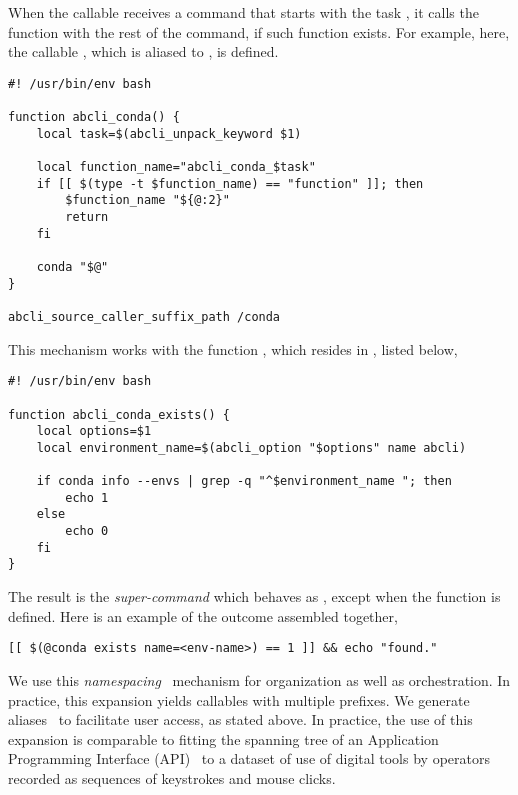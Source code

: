 When the callable  receives a command that starts with the task , it calls the function  with the rest of the command, if such function exists. For example, here, the callable , which is aliased to , is defined.

\begin{graybox}
\begin{verbatim}
#! /usr/bin/env bash

function abcli_conda() {
    local task=$(abcli_unpack_keyword $1)

    local function_name="abcli_conda_$task"
    if [[ $(type -t $function_name) == "function" ]]; then
        $function_name "${@:2}"
        return
    fi

    conda "$@"
}

abcli_source_caller_suffix_path /conda
\end{verbatim}
\end{graybox}
%
This mechanism works with the function , which resides in , listed below,
%
\begin{graybox}
\begin{verbatim}
#! /usr/bin/env bash

function abcli_conda_exists() {
    local options=$1
    local environment_name=$(abcli_option "$options" name abcli)

    if conda info --envs | grep -q "^$environment_name "; then
        echo 1
    else
        echo 0
    fi
}    
\end{verbatim}
\end{graybox}
%
The result is the \emph{super-command}  which behaves as , except when the function  is defined. Here is an example of the outcome assembled together,
%
\begin{graybox}
\begin{verbatim}
[[ $(@conda exists name=<env-name>) == 1 ]] && echo "found."
\end{verbatim}
\end{graybox}
%
We use this \emph{namespacing}~\cite{namespaces} mechanism for organization as well as orchestration. In practice, this expansion yields callables with multiple prefixes. We generate  aliases~\cite{aliases} to facilitate user access, as stated above. In practice, the use of this expansion is comparable to fitting the spanning tree of an Application Programming Interface (API)~\cite{fielding2000rest} to a dataset of use of digital tools by operators recorded as sequences of keystrokes and mouse clicks.